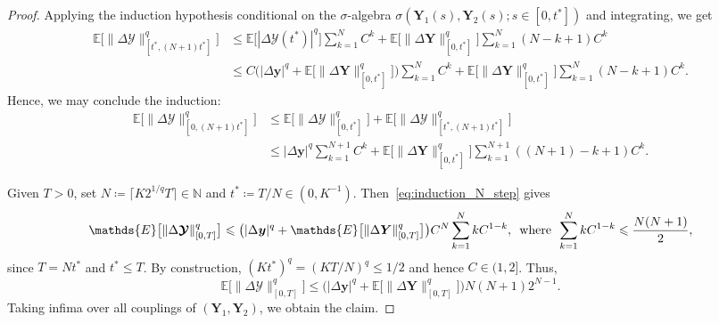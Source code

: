 \documentclass[10pt,a4paper]{amsart}
\newcommand\E{\mathds{E}}
\newcommand\N{\mathbb{N}}
\newcommand\Y{\bm{\mathcal{Y}}}
\newcommand{\ceil}[1]{\lceil#1\rceil}
\renewcommand\le{\leqslant}
\begin{document}
\begin{proof}
Applying the induction hypothesis conditional on the $\sigma$-algebra $\sigma(\bm{Y}_1(s),\bm{Y}_2(s);s\in[0,t^*])$ and integrating, we get
\begin{align*}
\E\big[\|\Delta\Y\|_{[t^*,(N+1)t^*]}^q\big]
&\le\E\big[|\Delta\Y(t^*)|^q\big] \sum_{k=1}^N C^k 
+\E\big[\|\Delta\bm{Y}\|_{[0,t^*]}^q\big]\sum_{k=1}^N (N-k+1)C^k\\
&\le C\big(|\Delta\bm{y}|^q + \E\big[\|\Delta\bm{Y}\|_{[0,t^*]}^q\big]\big) \sum_{k=1}^N C^k 
+\E\big[\|\Delta\bm{Y}\|_{[0,t^*]}^q\big]\sum_{k=1}^N (N-k+1)C^k.
\end{align*}
Hence, we may conclude the induction:
\begin{align*}
\E\big[\|\Delta\Y\|_{[0,(N+1)t^*]}^q\big]
&\le \E\big[\|\Delta\Y\|_{[0,t^*]}^q\big]
+ \E\big[\|\Delta\Y\|_{[t^*,(N+1)t^*]}^q\big]\\
&\le |\Delta\bm{y}|^q \sum_{k=1}^{N+1} C^{k}
+ \E\big[\|\Delta\bm{Y}\|_{[0,t^*]}^q\big] \sum_{k=1}^{N+1} ((N+1)-k+1)C^k.
\end{align*} 

Given $T>0$, set $N \coloneqq \ceil{K2^{1/q}T} \in \N$ and $t^*\coloneqq T/N \in (0,K^{-1})$. Then~\eqref{eq:induction_N_step} gives
\[
\E\big[\|\Delta\Y\|_{[0,T]}^q\big]
\le\big(|\Delta\bm{y}|^q 
    + \E\big[\|\Delta\bm{Y}\|_{[0,T]}^q\big]\big) C^{N} 
\sum_{k=1}^N kC^{1-k},
\enskip\text{where}\enskip
\sum_{k=1}^N kC^{1-k}
\le \frac{N(N+1)}{2},
\]
since $T=Nt^*$ and $t^*\le T$. By construction, $(Kt^*)^q=(KT/N)^q \le 1/2$ and hence $C \in (1,2]$. Thus, 
\begin{equation*}
\E\big[\|\Delta\Y\|_{[0,T]}^q\big]
\le \big(|\Delta\bm{y}|^q +\E\big[\|\Delta\bm{Y}\|_{[0,T]}^q\big]\big) N(N+1) 2^{N-1}. 
\end{equation*}
Taking infima over all couplings of $(\bm{Y}_1,\bm{Y}_2)$, we obtain the claim.
\end{proof}
\end{document}
